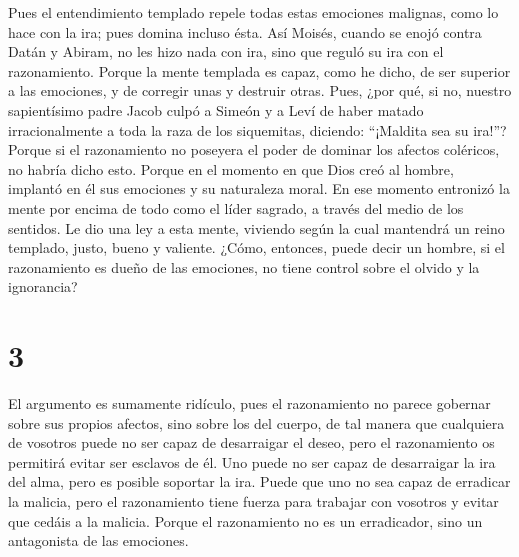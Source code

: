  Pues el entendimiento templado repele todas estas
emociones malignas, como lo hace con la ira; pues domina incluso ésta.
 Así Moisés, cuando se enojó contra Datán y Abiram, no
les hizo nada con ira, sino que reguló su ira con el razonamiento.
 Porque la mente templada es capaz, como he dicho, de ser
superior a las emociones, y de corregir unas y destruir otras.
 Pues, ¿por qué, si no, nuestro sapientísimo padre Jacob
culpó a Simeón y a Leví de haber matado irracionalmente a toda la raza
de los siquemitas, diciendo: ``¡Maldita sea su ira!''? 
Porque si el razonamiento no poseyera el poder de dominar los afectos
coléricos, no habría dicho esto.  Porque en el momento en
que Dios creó al hombre, implantó en él sus emociones y su naturaleza
moral.  En ese momento entronizó la mente por encima de
todo como el líder sagrado, a través del medio de los sentidos.
 Le dio una ley a esta mente, viviendo según la cual
mantendrá un reino templado, justo, bueno y valiente. 
¿Cómo, entonces, puede decir un hombre, si el razonamiento es dueño de
las emociones, no tiene control sobre el olvido y la ignorancia?

\hypertarget{section-2}{%
\section{3}\label{section-2}}

 El argumento es sumamente ridículo, pues el razonamiento
no parece gobernar sobre sus propios afectos, sino sobre los del cuerpo,
 de tal manera que cualquiera de vosotros puede no ser
capaz de desarraigar el deseo, pero el razonamiento os permitirá evitar
ser esclavos de él.  Uno puede no ser capaz de desarraigar
la ira del alma, pero es posible soportar la ira.  Puede
que uno no sea capaz de erradicar la malicia, pero el razonamiento tiene
fuerza para trabajar con vosotros y evitar que cedáis a la malicia.
 Porque el razonamiento no es un erradicador, sino un
antagonista de las emociones.

